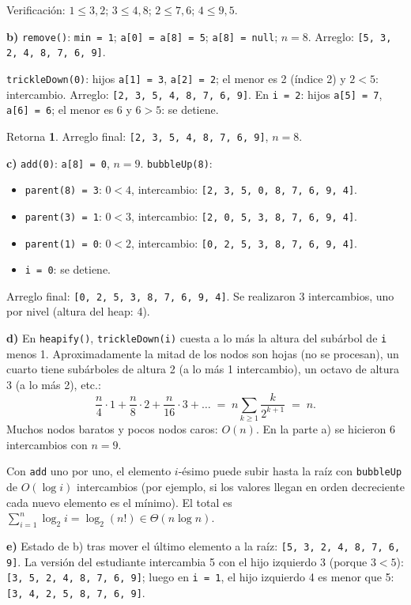 \documentclass[11pt,a4paper]{article}
\begin{document}
Verificación: $1 \le 3, 2$; $3 \le 4, 8$; $2 \le 7, 6$; $4 \le 9, 5$.

\textbf{b)} \texttt{remove()}: \texttt{min = 1}; \texttt{a[0] = a[8] = 5}; \texttt{a[8] = null}; $n = 8$. Arreglo: \texttt{[5, 3, 2, 4, 8, 7, 6, 9]}.

\texttt{trickleDown(0)}: hijos \texttt{a[1] = 3}, \texttt{a[2] = 2}; el menor es 2 (índice 2) y $2 < 5$: intercambio. Arreglo: \texttt{[2, 3, 5, 4, 8, 7, 6, 9]}. En \texttt{i = 2}: hijos \texttt{a[5] = 7}, \texttt{a[6] = 6}; el menor es 6 y $6 > 5$: se detiene.

Retorna \textbf{1}. Arreglo final: \texttt{[2, 3, 5, 4, 8, 7, 6, 9]}, $n = 8$.

\textbf{c)} \texttt{add(0)}: \texttt{a[8] = 0}, $n = 9$. \texttt{bubbleUp(8)}:
\begin{itemize}[itemsep=0pt]
\item \texttt{parent(8) = 3}: $0 < 4$, intercambio: \texttt{[2, 3, 5, 0, 8, 7, 6, 9, 4]}.
\item \texttt{parent(3) = 1}: $0 < 3$, intercambio: \texttt{[2, 0, 5, 3, 8, 7, 6, 9, 4]}.
\item \texttt{parent(1) = 0}: $0 < 2$, intercambio: \texttt{[0, 2, 5, 3, 8, 7, 6, 9, 4]}.
\item \texttt{i = 0}: se detiene.
\end{itemize}
Arreglo final: \texttt{[0, 2, 5, 3, 8, 7, 6, 9, 4]}. Se realizaron 3 intercambios, uno por nivel (altura del heap: 4).

\textbf{d)} En \texttt{heapify()}, \texttt{trickleDown(i)} cuesta a lo más la altura del subárbol de \texttt{i} menos 1. Aproximadamente la mitad de los nodos son hojas (no se procesan), un cuarto tiene subárboles de altura 2 (a lo más 1 intercambio), un octavo de altura 3 (a lo más 2), etc.:
\[
\frac{n}{4}\cdot 1 + \frac{n}{8}\cdot 2 + \frac{n}{16}\cdot 3 + \dots \;=\; n \sum_{k \ge 1} \frac{k}{2^{k+1}} \;=\; n.
\]
Muchos nodos baratos y pocos nodos caros: $O(n)$. En la parte a) se hicieron 6 intercambios con $n = 9$.

Con \texttt{add} uno por uno, el elemento $i$-ésimo puede subir hasta la raíz con \texttt{bubbleUp} de $O(\log i)$ intercambios (por ejemplo, si los valores llegan en orden decreciente cada nuevo elemento es el mínimo). El total es $\sum_{i=1}^{n} \log_2 i = \log_2(n!) \in \Theta(n \log n)$.

\textbf{e)} Estado de b) tras mover el último elemento a la raíz: \texttt{[5, 3, 2, 4, 8, 7, 6, 9]}. La versión del estudiante intercambia 5 con el hijo izquierdo 3 (porque $3 < 5$): \texttt{[3, 5, 2, 4, 8, 7, 6, 9]}; luego en \texttt{i = 1}, el hijo izquierdo 4 es menor que 5: \texttt{[3, 4, 2, 5, 8, 7, 6, 9]}.
\end{document}
